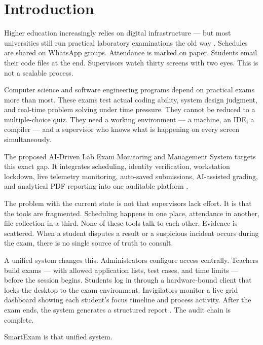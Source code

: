 \chapter{Introduction}
\label{chap:introduction}

Higher education increasingly relies on digital infrastructure — but most universities still run practical laboratory examinations the old way \cite{pmc_cbt}. Schedules are shared on WhatsApp groups. Attendance is marked on paper. Students email their code files at the end. Supervisors watch thirty screens with two eyes. This is not a scalable process.

Computer science and software engineering programs depend on practical exams more than most. These exams test actual coding ability, system design judgment, and real-time problem solving under time pressure. They cannot be reduced to a multiple-choice quiz. They need a working environment — a machine, an IDE, a compiler — and a supervisor who knows what is happening on every screen simultaneously.

The proposed AI-Driven Lab Exam Monitoring and Management System targets this exact gap. It integrates scheduling, identity verification, workstation lockdown, live telemetry monitoring, auto-saved submissions, AI-assisted grading, and analytical PDF reporting into one auditable platform \cite{pmc_cbt}.

The problem with the current state is not that supervisors lack effort. It is that the tools are fragmented. Scheduling happens in one place, attendance in another, file collection in a third. None of these tools talk to each other. Evidence is scattered. When a student disputes a result or a suspicious incident occurs during the exam, there is no single source of truth to consult.

A unified system changes this. Administrators configure access centrally. Teachers build exams — with allowed application lists, test cases, and time limits — before the session begins. Students log in through a hardware-bound client that locks the desktop to the exam environment. Invigilators monitor a live grid dashboard showing each student's focus timeline and process activity. After the exam ends, the system generates a structured report \cite{integ1}. The audit chain is complete.

SmartExam is that unified system.
